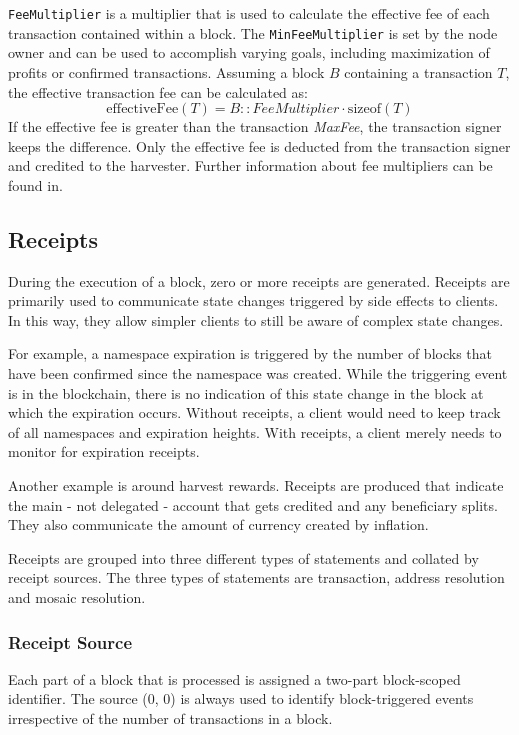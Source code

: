 \texttt{FeeMultiplier} is a multiplier that is used to calculate the effective fee of each transaction contained within a block.
The \texttt{MinFeeMultiplier} is set by the node owner and can be used to accomplish varying goals, including maximization of profits or confirmed transactions.
Assuming a block $B$ containing a transaction $T$, the effective transaction fee can be calculated as:
$$\mathrm{effectiveFee}(T) = B::FeeMultiplier  \cdot \mathrm{sizeof}(T)$$
If the effective fee is greater than the transaction \textit{MaxFee}, the transaction signer keeps the difference.
Only the effective fee is deducted from the transaction signer and credited to the harvester.
Further information about fee multipliers can be found in.

\subsection{Receipts}
\label{sec:blocks:receipts}

During the execution of a block, zero or more receipts are generated.
Receipts are primarily used to communicate state changes triggered by side effects to clients.
In this way, they allow simpler clients to still be aware of complex state changes.

For example, a namespace expiration is triggered by the number of blocks that have been confirmed since the namespace was created.
While the triggering event is in the blockchain, there is no indication of this state change in the block at which the expiration occurs.
Without receipts, a client would need to keep track of all namespaces and expiration heights.
With receipts, a client merely needs to monitor for expiration receipts.

Another example is around harvest rewards.
Receipts are produced that indicate the main - not delegated - account that gets credited and any beneficiary splits.
They also communicate the amount of currency created by inflation.

Receipts are grouped into three different types of statements and collated by receipt sources.
The three types of statements are transaction, address resolution and mosaic resolution.

\subsubsection{Receipt Source}

Each part of a block that is processed is assigned a two-part block-scoped identifier.
The source (0, 0) is always used to identify block-triggered events irrespective of the number of transactions in a block.

